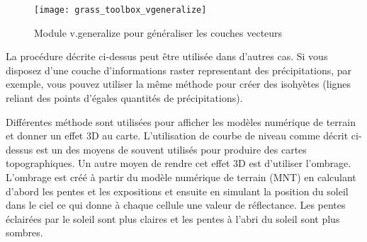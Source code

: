 \begin{figure}[ht]
 \begin{center}
 \texttt{[image: grass\_toolbox\_vgeneralize]}
 \caption{Module \grass v.generalize pour généraliser les couches vecteurs \nixcaption}\label{fig:grass_toolbox_vgeneralize}
 \end{center}
\end{figure}

\begin{Tip}\caption{\textsc{Autres utilisations de r.contour}}
La procédure décrite ci-dessus peut être utilisée dans d'autres cas. Si vous disposez d'une couche d'informations raster representant des précipitations, par exemple, vous pouvez utiliser la même méthode pour créer des isohyètes (lignes reliant des points d'égales quantités de précipitations).
\end{Tip}  



Différentes méthode sont utilisées pour afficher les modèles numérique de terrain et donner un effet 3D au carte.
L'utilisation de courbe de niveau comme décrit ci-dessus est un des moyens de souvent utilisés pour produire des cartes topographiques.
Un autre moyen de rendre cet effet 3D est d'utiliser l'ombrage. L'ombrage est créé à partir du modèle numérique de terrain (MNT) en calculant d'abord les pentes et les expositions et ensuite en simulant la position du soleil dans le ciel ce qui donne à chaque cellule une valeur de réflectance. Les pentes éclairées par le soleil sont plus claires et les pentes à l'abri du soleil sont plus sombres.

